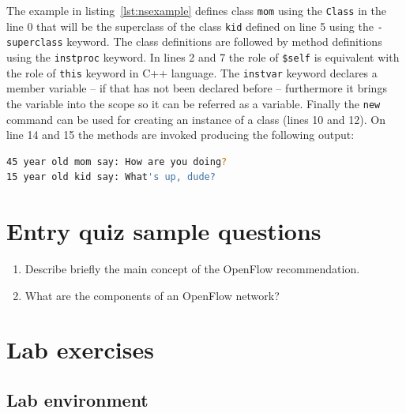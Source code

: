 \documentclass[a4paper]{article}
\begin{document}
The example in listing~\ref{lst:nsexample} defines class \verb!mom! using the \verb!Class! in the line 0 that will be the superclass of the class \verb!kid! defined on line 5 using the \verb!-superclass! keyword. The class definitions are followed by method definitions using the \verb!instproc! keyword. In lines 2 and 7 the role of \verb!$self! is equivalent with the role of \verb!this! keyword in C++ language. The \verb!instvar! keyword declares a member variable -- if that has not been declared before -- furthermore it brings the variable into the scope so it can be referred as a variable. Finally the \verb!new! command can be used for creating an instance of a class (lines 10 and 12). On line 14 and 15 the methods are invoked producing the following output:
\begin{lstlisting}[language=bash]
45 year old mom say: How are you doing?
15 year old kid say: What's up, dude?
\end{lstlisting}


\appendix

\section{Entry quiz sample questions}

\begin{enumerate}
    \item Describe briefly the main concept of the OpenFlow recommendation.
    \item What are the components of an OpenFlow network?
\end{enumerate}

\section{Lab exercises}

\subsection{Lab environment}
\end{document}
